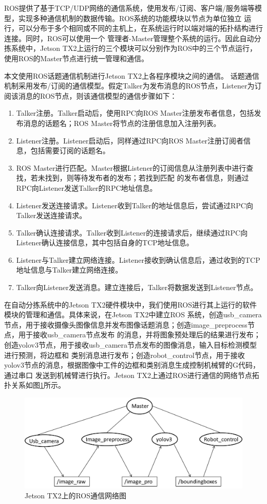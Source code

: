ROS提供了基于TCP/UDP网络的通信系统，使用发布/订阅、客户端/服务端等模型，实现多种通信机制的数据传输。ROS系统的功能模块以节点为单位独立
运行，可以分布于多个相同或不同的主机上，在系统运行时以端对端的拓扑结构进行连接。同时，ROS可以使用一个
管理者-Master管理整个系统的运行。因此自动分拣系统中，Jetson TX2上运行的三个模块可以分别作为ROS中的三个节点运行，
使用ROS的Master节点进行统一管理和通信。

本文使用ROS话题通信机制进行Jetson TX2上各程序模块之间的通信。
话题通信机制采用发布/订阅的通信模型。假定Talker为发布消息的ROS节点，Listener为订阅该消息的ROS节点，则该通信模型的通信步骤如下：
\begin{enumerate}
    \item{Talker注册。Talker启动后，使用RPC向ROS Master注册发布者信息，包括发布消息的话题名；ROS Master将节点的注册信息加入注册列表。}
    \item{Listener注册。Listener启动后，同样通过RPC向ROS Master注册订阅者信息，包括需要订阅的话题名。}
    \item{ROS Master进行匹配。Master根据Listener的订阅信息从注册列表中进行查找，若未找到，则等待发布者的发布；若找到匹配
    的发布者信息，则通过RPC向Listener发送Talker的RPC地址信息。}
    \item{Listener发送连接请求。Listener收到Talker的地址信息后，尝试通过RPC向Talker发送连接请求。}
    \item {Talker确认连接请求。Talker收到Listener的连接请求后，继续通过RPC向Listener确认连接信息，其中包括自身的TCP地址信息。}
    \item {Listener与Talker建立网络连接。Listener接收到确认信息后，通过收到的TCP地址信息与Talker建立网络连接。}
    \item {Talker向Listener发送消息。建立连接后，Talker将数据发送到Listener节点。}
\end{enumerate}

在自动分拣系统中的Jetson TX2硬件模块中，我们使用ROS进行其上运行的软件模块的管理和通信。具体来说，在Jetson TX2中建立ROS
系统，创造usb\_camera节点，用于接收摄像头图像信息并发布图像话题消息；创造image\_preprocess节点，用于接收usb\_camera节点发布
的消息，并将图象预处理后的结果进行发布；创造yolov3节点，用于接收usb\_camera节点发布的图像消息，输入目标检测模型进行预测，将边框和
类别消息进行发布；创造robot\_control节点，用于接收yolov3节点的消息，根据图像中工件的边框和类别消息生成控制机械臂的G代码，通过串口
发送到机械臂进行执行。Jetson TX2上通过ROS进行通信的网络节点拓扑关系如图\ref{fig:ROS_com}所示。

\begin{figure}
    \centering
    \includegraphics[width=\textwidth]{pic/chap2/ROS_com.jpg}
    \caption{Jetson TX2上的ROS通信网络图}
    \label{fig:ROS_com}
\end{figure}


